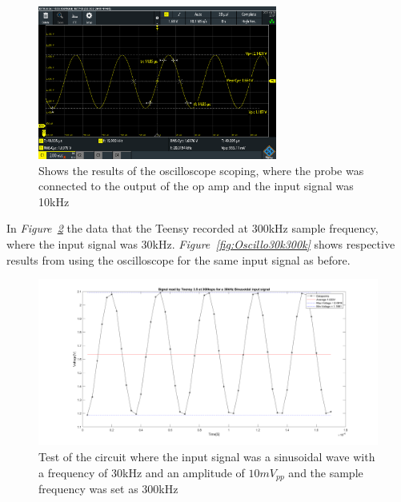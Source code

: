 \begin{figure}[h]
    \centering
    \includegraphics[width=0.7\textwidth]{graphics/20k10mvPP200ksamp.PNG}
    \caption{Shows the results of the oscilloscope scoping, where the probe was connected to the output of the op amp and the input signal was 10kHz}
    \label{fig:Oscillo20k200k}
\end{figure}

\vspace{4cm}

In \textit{Figure~\ref{fig:Teensy30k300k}} the data that the Teensy recorded at 300kHz sample frequency, where the input signal was 30kHz.
\textit{Figure~\ref{fig:Oscillo30k300k}} shows respective results from using the oscilloscope for the same input signal as before.

\begin{figure}[h]
    \centering
    \includegraphics[width=1.0\textwidth]{graphics/30kin_300ksampl.png}
    \caption{Test of the circuit where the input signal was a sinusoidal wave with a frequency of 30kHz and an amplitude of $10mV_{pp}$ and the sample frequency was set as 300kHz}
    \label{fig:Teensy30k300k}
\end{figure}

